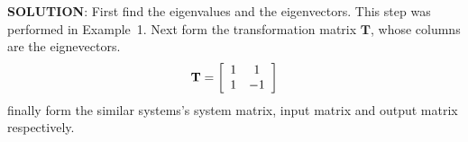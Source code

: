 \textbf{SOLUTION}: First find the eigenvalues and the eigenvectors. This step was performed in Example~1. Next form the transformation matrix $\mathbf{T}$, whose columns are the eignevectors.
\[
{\bf{T}} = \left[ {\begin{array}{*{20}c}
   1 & 1  \\
   1 & { - 1}  \\
\end{array}} \right]
\]
finally form the similar systems's system matrix, input matrix and output matrix respectively.
